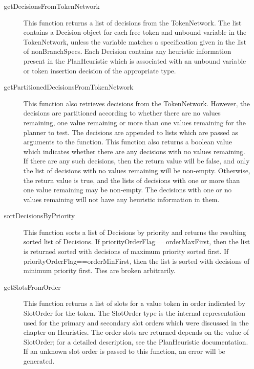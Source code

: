 \begin{description}
\item[getDecisionsFromTokenNetwork]        
        This function returns a list of decisions from the TokenNetwork.  
    The list contains a Decision object for each
        free token and unbound variable in the TokenNetwork, unless the variable matches a specification
        given in the list of nonBranchSpecs.  Each Decision contains any heuristic information
        present in the PlanHeuristic which is associated with an unbound variable or token insertion decision
        of the appropriate type.  
        

\item[getPartitionedDecisionsFromTokenNetwork]        
        This function also retrieves decisions from the TokenNetwork.  However, the decisions are
    partitioned according to whether there are no values remaining, one value remaining or
    more than one values remaining for the planner to test.  The decisions are appended to lists
    which are passed as arguments to the function.  This function also returns a boolean
    value which indicates whether there are any decisions with no values remaining.  If there
    are any such decisions, then the return value will be false, and only the list of
    decisions with no values remaining will be non-empty.  Otherwise, the return value is true,
    and the lists of decisions with one or more than one value remaining may be non-empty.
    The decisions with one or no values remaining will not have any heuristic information in
    them.
       

\item[sortDecisionsByPriority]        
        This function sorts a list of Decisions by priority and returns the resulting sorted list of Decisions. 
        If  priorityOrderFlag==orderMaxFirst, then the list is returned sorted with decisions of
        maximum priority sorted first.  If priorityOrderFlag==orderMinFirst, then the list is
        sorted with decisions of minimum priority first.
        Ties are broken arbitrarily.


\item[getSlotsFromOrder]        
        This function returns a list of slots for a value token in order indicated by SlotOrder for the token. 
    The SlotOrder type is the internal representation used for the primary and secondary slot orders
    which were discussed in the chapter on Heuristics. 
        The order slots are returned depends on the value of SlotOrder;
        for a detailed description, see the PlanHeuristic documentation.  If an unknown slot order
        is passed to this function, an error will be generated.        


\end{description}
